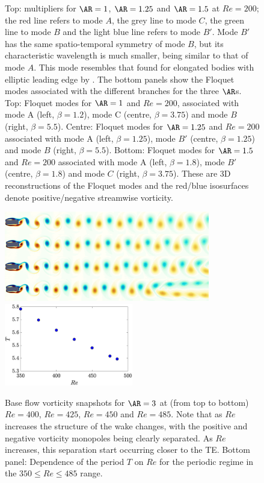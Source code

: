 \documentclass[onecolumn,notitlepage,superscriptaddress, amsmath,amssymb,longbibliographyaps,floatfix]{revtex4-1}
\begin{document}
\begin{figure}
  \caption{Top: multipliers for $\AR=1$, $\AR=1.25$ and $\AR=1.5$ at $Re=200$; the red line refers to mode $A$, the grey line to mode $C$, the green line to mode $B$ and the light blue line refers to mode $B'$. Mode $B'$ has the same spatio-temporal symmetry of mode $B$, but its characteristic wavelength is much smaller, being similar to that of mode $A$. This mode resembles that found for elongated bodies with elliptic leading edge by \cite{ryan-etal-2005}. The bottom panels show the Floquet modes associated with the different branches for the three $\AR$s. Top: Floquet modes for $\AR=1$ and $Re=200$, associated with mode A (left, $\beta=1.2$), mode C (centre, $\beta=3.75$) and mode $B$ (right, $\beta=5.5$). Centre: Floquet modes for $\AR=1.25$ and $Re=200$ associated with mode A (left, $\beta=1.25$), mode $B'$ (centre, $\beta = 1.25$) and mode $B$ (right, $\beta=5.5$). Bottom: Floquet modes for $\AR=1.5$ and $Re=200$ associated with mode A (left, $\beta=1.8$), mode $B'$ (centre, $\beta=1.8$) and mode $C$ (right, $\beta=3.75$). These are 3D reconstructions of the Floquet modes and the red/blue isosurfaces denote positive/negative streamwise vorticity.}
  \label{fig:xx}
\end{figure}


\begin{figure}
  \centering
  \includegraphics[width=0.8\textwidth]{./fig/AR3/BF_vort_Re400_475.png}
  \includegraphics[width=0.5\textwidth]{./fig/AR3/T_Re.eps}
  \caption{Base flow vorticity snapshots for $\AR=3$ at (from top to bottom) $Re=400$, $Re=425$, $Re=450$ and $Re=485$. Note that as $Re$ increases the structure of the wake changes, with the positive and negative vorticity monopoles being clearly separated. As $Re$ increases, this separation start occurring closer to the TE. Bottom panel: Dependence of the period $T$ on $Re$ for the periodic regime in the $350 \le Re \le 485$ range.}
  \label{fig:BF_AR3}
\end{figure}
\end{document}
